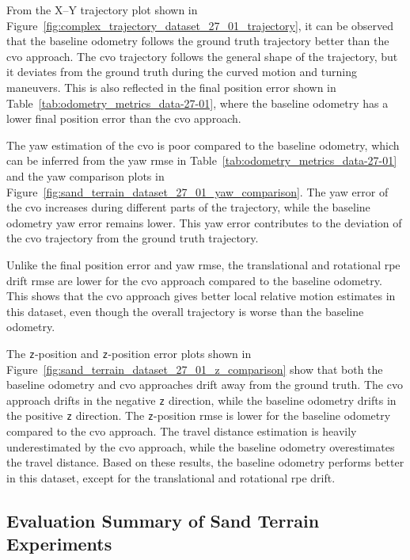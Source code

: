 \documentclass[report.tex]{subfiles}
\begin{document}
    
    From the X--Y trajectory plot shown in Figure~\ref{fig:complex_trajectory_dataset_27_01_trajectory}, it can be observed that the baseline odometry follows the ground truth trajectory better than the \gls{cvo} approach. The \gls{cvo} trajectory follows the general shape of the trajectory, but it deviates from the ground truth during the curved motion and turning maneuvers. This is also reflected in the final position error shown in Table~\ref{tab:odometry_metrics_data-27-01}, where the baseline odometry has a lower final position error than the \gls{cvo} approach.

    The yaw estimation of the \gls{cvo} is poor compared to the baseline odometry, which can be inferred from the yaw \gls{rmse} in Table~\ref{tab:odometry_metrics_data-27-01} and the yaw comparison plots in Figure~\ref{fig:sand_terrain_dataset_27_01_yaw_comparison}. The yaw error of the \gls{cvo} increases during different parts of the trajectory, while the baseline odometry yaw error remains lower. This yaw error contributes to the deviation of the \gls{cvo} trajectory from the ground truth trajectory.

    Unlike the final position error and yaw \gls{rmse}, the translational and rotational \gls{rpe} drift \gls{rmse} are lower for the \gls{cvo} approach compared to the baseline odometry. This shows that the \gls{cvo} approach gives better local relative motion estimates in this dataset, even though the overall trajectory is worse than the baseline odometry.

    The \texttt{z}-position and \texttt{z}-position error plots shown in Figure~\ref{fig:sand_terrain_dataset_27_01_z_comparison} show that both the baseline odometry and \gls{cvo} approaches drift away from the ground truth. The \gls{cvo} approach drifts in the negative \texttt{z} direction, while the baseline odometry drifts in the positive \texttt{z} direction. The \texttt{z}-position \gls{rmse} is lower for the baseline odometry compared to the \gls{cvo} approach. The travel distance estimation is heavily underestimated by the \gls{cvo} approach, while the baseline odometry overestimates the travel distance. Based on these results, the baseline odometry performs better in this dataset, except for the translational and rotational \gls{rpe} drift.
    \FloatBarrier

    \subsection{Evaluation Summary of Sand Terrain Experiments}
    
\end{document}
